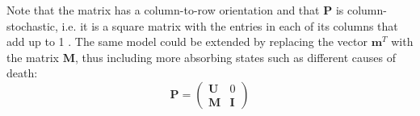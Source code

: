 \noindent Note that the matrix has a column-to-row orientation and that $\mathbf{P}$ is column-stochastic, i.e. it is a square matrix with the entries in each of its columns that add up to 1 \citep{Poole1995}. 
The same model could be extended by replacing the vector $\mathbf{m}^T$ with the matrix $\mathbf{M}$, thus including more absorbing states such as different causes of death:
\begin{equation}\label{matrixmodel}
    \mathbf{P} = \begin{pmatrix}
        \mathbf{U} &  0\\
    \mathbf{M}& \mathbf{I}
    \end{pmatrix}
\end{equation}









